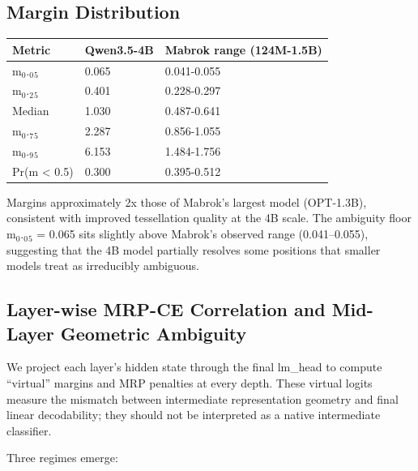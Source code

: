 \documentclass[
  11pt,
]{article}
\begin{document}
\hypertarget{margin-distribution}{%
\subsection{Margin Distribution}\label{margin-distribution}}

\begin{longtable}[]{@{}lll@{}}
\toprule\noalign{}
Metric & Qwen3.5-4B & Mabrok range (124M-1.5B) \\
\midrule\noalign{}
\endhead
\bottomrule\noalign{}
\endlastfoot
m$_0$.$_0$$_5$ & 0.065 & 0.041-0.055 \\
m$_0$.$_2$$_5$ & 0.401 & 0.228-0.297 \\
Median & 1.030 & 0.487-0.641 \\
m$_0$.$_7$$_5$ & 2.287 & 0.856-1.055 \\
m$_0$.$_9$$_5$ & 6.153 & 1.484-1.756 \\
Pr(m \textless{} 0.5) & 0.300 & 0.395-0.512 \\
\end{longtable}

Margins approximately 2x those of Mabrok's largest model (OPT-1.3B),
consistent with improved tessellation quality at the 4B scale. The
ambiguity floor m$_0$.$_0$$_5$ = 0.065 sits slightly above Mabrok's observed
range (0.041--0.055), suggesting that the 4B model partially resolves
some positions that smaller models treat as irreducibly ambiguous.

\hypertarget{layer-wise-mrp-ce-correlation-and-mid-layer-geometric-ambiguity}{%
\subsection{Layer-wise MRP-CE Correlation and Mid-Layer Geometric
Ambiguity}\label{layer-wise-mrp-ce-correlation-and-mid-layer-geometric-ambiguity}}

We project each layer's hidden state through the final lm\_head to
compute ``virtual'' margins and MRP penalties at every depth. These
virtual logits measure the mismatch between intermediate representation
geometry and final linear decodability; they should not be interpreted
as a native intermediate classifier.

Three regimes emerge:
\end{document}
